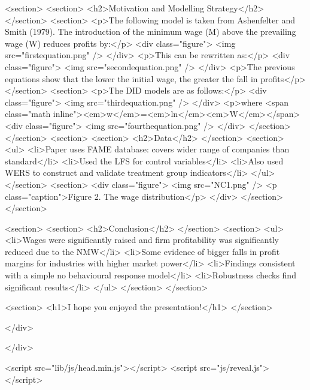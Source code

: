 				<section>
					<section>
					<h2>Motivation and Modelling Strategy</h2>
					</section>
					<section>
					<p>The following model is taken from Ashenfelter and Smith (1979). The introduction of the minimum wage (M) above the prevailing wage (W) reduces profits by:</p>
						 <div class="figure">
						 	<img src="firstequation.png" />
						 </div>
				    <p>This can be rewritten as:</p>
				         <div class="figure">
				         	<img src="secondequation.png" />
				         </div>
				    <p>The previous equations show that the lower the initial wage, the greater the fall in profits</p>
				    </section>
				    <section>
				     <p>The DID  models are as follows:</p>
				     	  <div class="figure">
				     	  	<img src="thirdequation.png" />
				     	  </div>
				     <p>where <span class="math inline"><em>w</em>=<em>ln</em><em>W</em></span>
				     	  <div class="figure">
				     	  	<img src="fourthequation.png" />
				     	  </div>
				    </section>
					</section>	
				<section>
					<section>
					  <h2>Data</h2>
                    </section>
			        <section>
			        <ul>
			        	<li>Paper uses FAME database: covers wider range of companies than standard</li>
			        	<li>Used the LFS for control variables</li>
			        	<li>Also used WERS to construct and validate treatment group indicators</li>
			        </ul>
			        </section>	
				    <section>
				    	<div class="figure">
				    		<img src="NC1.png" />
				        <p class="caption">Figure 2. The wage distribution</p>
				    	</div>
				     </section>
				  </section>
				
                 <section>
                 	<section>
                 		<h2>Conclusion</h2>
                 	</section>
                 	<section>
                 	<ul>
                 		<li>Wages were significantly raised and firm profitability was significantly reduced due to the NMW</li>
                 		<li>Some evidence of bigger falls in profit margins for industries with higher market power</li>
                 		<li>Findings consistent with a simple no behavioural response model</li>
                 		<li>Robustness checks find significant results</li>
                 	</ul>
                    </section>
			      </section>
			      
			      <section>
			      	<h1>I hope you enjoyed the presentation!</h1>
			      </section>

			</div>

		</div>

		<script src="lib/js/head.min.js"></script>
		<script src="js/reveal.js"></script>

